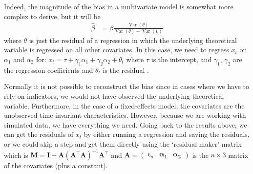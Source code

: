 \documentclass[]{interact}
\theoremstyle{plain}%
\theoremstyle{definition}
\theoremstyle{remark}
\begin{document}
Indeed, the magnitude of the bias in a multivariate model is somewhat
more complex to derive, but it will be \begin{align}
\hat{\beta} & = \beta \frac{\mathop{\mathrm{\mathrm{Var}}}(\theta)}{\mathop{\mathrm{\mathrm{Var}}}(\theta) + \mathop{\mathrm{\mathrm{Var}}}(\upsilon)}
\end{align} where \(\theta\) is just the residual of a regression in
which the underlying theoretical variable is regressed on all other
covariates. In this case, we need to regress \(x_{t}\) on \(\alpha_{1}\)
and \(\alpha_{2}\) for:
\(x_{t} = \tau + \gamma_{1}\alpha_{1} + \gamma_{2}\alpha_{2} + \theta_{t}\)
where \(\tau\) is the intercept, and \(\gamma_{1}\), \(\gamma_{2}\) are
the regression coefficients and \(\theta_{t}\) is the residual
\citep[p.~318--320]{Wooldridge2009}.

Normally it is not possible to reconstruct the bias since in cases where
we have to rely on indicators, we would not have observed the underlying
theoretical variable. Furthermore, in the case of a fixed-effects model,
the covariates are the unobserved time-invariant characteristics.
However, because we are working with simulated data, we have everything
we need. Going back to the results above, we can get the residuals of
\(x_{t}\) by either running a regression and saving the residuals, or we
could skip a step and get them directly using the `residual maker'
matrix \citep{Ruettenauer2020} which is
\(\bm{M} = \bm{I} - \bm{A}(\bm{A}^{\intercal}\bm{A})^{-1}\bm{A}^{\intercal}\)
and
\(\bm{A} = \begin{pmatrix}\bm{\iota}_{n} & \bm{\alpha_{1}} & \bm{\alpha_{2}}\end{pmatrix}\)
is the \(n \times 3\) matrix of the covariates (plus a constant).

\singlespacing
\end{document}
